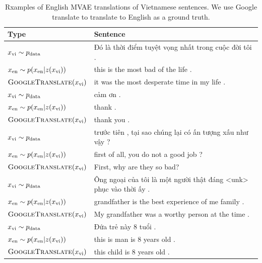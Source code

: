 \begin{table}[tb]
\centering
\scriptsize
\begin{tabular}{ l|l }
  \toprule
  \textbf{Type} & \textbf{Sentence} \\
  \hline
  $x_{\textup{vi}} \sim p_{\textup{data}}$ & \foreignlanguage{vietnamese}{Đó là thời điểm tuyệt vọng nhất trong cuộc đời tôi .} \\
  $x_{\textup{en}} \sim p(x_{\textup{en}}|z(x_{\textup{vi}}))$ & this is the most bad of the life . \\
  $\textsc{GoogleTranslate}(x_{\textup{vi}})$ & it was the most desperate time in my life . \\
  \hline
  $x_{\textup{vi}} \sim p_{\textup{data}}$ & \foreignlanguage{vietnamese}{cảm ơn .} \\
  $x_{\textup{en}} \sim p(x_{\textup{en}}|z(x_{\textup{vi}}))$ & thank . \\
  $\textsc{GoogleTranslate}(x_{\textup{vi}})$ & thank you . \\
  \hline
  $x_{\textup{vi}} \sim p_{\textup{data}}$ & \foreignlanguage{vietnamese}{trước tiên , tại sao chúng lại có ấn tượng xấu như vậy ?} \\
  $x_{\textup{en}} \sim p(x_{\textup{en}}|z(x_{\textup{vi}}))$ & first of all, you do not a good job ? \\
  $\textsc{GoogleTranslate}(x_{\textup{vi}})$ & First, why are they so bad? \\
  \hline
  $x_{\textup{vi}} \sim p_{\textup{data}}$ & \foreignlanguage{vietnamese}{Ông ngoại của tôi là một người thật đáng <unk> phục vào thời ấy .} \\
  $x_{\textup{en}} \sim p(x_{\textup{en}}|z(x_{\textup{vi}}))$ & grandfather is the best experience of me family . \\
  $\textsc{GoogleTranslate}(x_{\textup{vi}})$ & My grandfather was a worthy person at the time . \\
  \hline
  $x_{\textup{vi}} \sim p_{\textup{data}}$ & \foreignlanguage{vietnamese}{Đứa trẻ này 8 tuổi .} \\
  $x_{\textup{en}} \sim p(x_{\textup{en}}|z(x_{\textup{vi}}))$ & this is man is 8 years old . \\
  $\textsc{GoogleTranslate}(x_{\textup{vi}})$ & this child is 8 years old . \\
  \bottomrule
\end{tabular}
\caption{Rxamples of English MVAE translations of Vietnamese sentences. We use Google translate to translate to English as a ground truth.}
\end{table}

